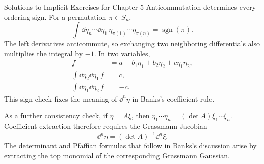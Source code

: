 \begin{bankssolutions}{Solutions to Implicit Exercises for Chapter 5}
Anticommutation determines every ordering sign.  For a permutation
$\pi\in S_n$,
\begin{equation*}
  \int\dd\eta_n\cdots\dd\eta_1\,
  \eta_{\pi(1)}\cdots\eta_{\pi(n)}
  =\operatorname{sgn}(\pi).
\end{equation*}
The left derivatives anticommute, so exchanging two neighboring
differentials also multiplies the integral by $-1$.  In two variables,
\begin{align*}
  f&=a+b_1\eta_1+b_2\eta_2+c\eta_1\eta_2,\\
  \int\dd\eta_2\dd\eta_1\,f&=c,\\
  \int\dd\eta_1\dd\eta_2\,f&=-c.
\end{align*}
This sign check fixes the meaning of $\dd^n\eta$ in Banks's coefficient rule.

As a further consistency check, if $\eta=A\xi$, then
$\eta_1\cdots\eta_n=(\det A)\xi_1\cdots\xi_n$.  Coefficient extraction
therefore requires the Grassmann Jacobian
\begin{equation*}
  \dd^n\eta=(\det A)^{-1}\dd^n\xi.
\end{equation*}
The determinant and Pfaffian formulas that follow in Banks's discussion arise
by extracting the top monomial of the corresponding Grassmann Gaussian.

\end{bankssolutions}
